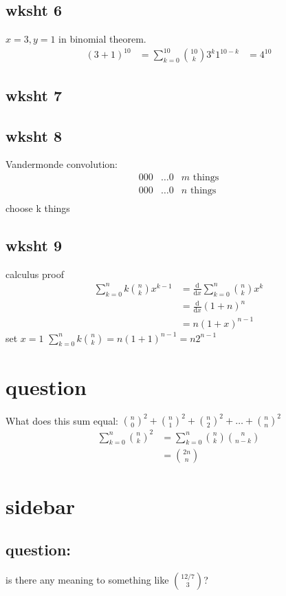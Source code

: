 \documentclass{article}
\begin{document}
\subsection*{wksht 6}
$x=3, y=1$ in binomial theorem.
\begin{align*}
  (3+1)^{10}&=\sum\limits_{k=0}^{10}{\binom{10}{k}3^k1^{10-k}}
  &=4^{10}
\end{align*}
\subsection*{wksht 7}
\subsection*{wksht 8}
Vandermonde convolution:
\begin{align*}
  000&\dots0&m\text{ things}\\
  000&\dots0&n\text{ things}\\
\end{align*}
choose k things
\subsection*{wksht 9}
calculus proof
\begin{align*}
  \sum\limits_{k=0}^n{k\binom{n}{k}x^{k-1}}&=\frac{\mathrm{d}}{\mathrm{d}x}\sum\limits_{k=0}^n{\binom{n}{k}x^k}\\
  &=\frac{\mathrm{d}}{\mathrm{d}x}(1+n)^n\\
  &=n(1+x)^{n-1}
\end{align*}
set $x=1$ $\sum\limits_{k=0}^n{k\binom{n}{k}}=n(1+1)^{n-1}=n2^{n-1}$
\section*{question}
What does this sum equal:
$\binom{n}{0}^2+\binom{n}{1}^2+\binom{n}{2}^2+\dots+\binom{n}{n}^2$
\begin{align*}
  \sum\limits_{k=0}^n{\binom{n}{k}^2}&=\sum\limits_{k=0}^n{\binom{n}{k}\binom{n}{n-k}}\\
  &=\binom{2n}{n}
\end{align*}
\section*{sidebar}
\subsection*{question:}is there any meaning to something like $\binom{12/7}{3}$?
\end{document}
